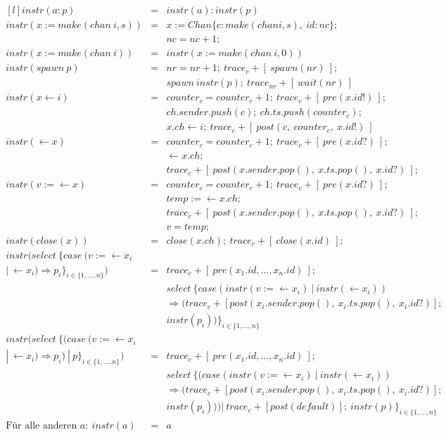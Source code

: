 \begin{align*}
  \begin{matrix*}[l]
    instr(a : p) &=& instr(a) : instr(p)\\
    instr(x := make(chan\ i, s)) & = & x := Chan\{c: make(chan i, s),\ id: nc\};\\
                             &  & nc = nc + 1;\\
    instr(x := make(chan\ i)) & = & instr(x := make(chan\ i, 0))\\
    instr(spawn\ p) & = & nr = nr + 1;\ trace_c + [\ spawn(nr)\ ];\\
                   &   & spawn\ instr(p);\ trace_{nr} + [\ wait(nr)\ ] \\
    instr( x \leftarrow i ) & = & counter_c = counter_c + 1;\ trace_c + [\ pre(x.id!)\ ];\\
      & & ch.sender.push(c);\ ch.ts.push(counter_c);\\
      & & x.ch \leftarrow i;\ trace_c + [\ post(c,\ counter_c,\ x.id!)\ ]\\
    instr( \leftarrow x) & = & counter_c = counter_c + 1;\ trace_c + [\ pre(x.id?)\ ];\\
      & & \leftarrow x.ch;\\
      & & trace_c + [\ post(x.sender.pop(),\ x.ts.pop(),\ x.id?) \ ];\\
    instr( v := \leftarrow x) & = & counter_c = counter_c + 1;\ trace_c + [\ pre(x.id?)\ ];\\
      & & temp := \leftarrow x.ch;\\
      & & trace_c + [\ post(x.sender.pop(),\ x.ts.pop(),\ x.id?) \ ];\\
      & & v = temp;\\
    instr( close(x) ) & = & close(x.ch);\ trace_c + [\ close(x.id)\ ];\\
    instr(select\ \{case\ (v := \leftarrow x_i\\ 
      |\ \leftarrow x_i) \Rightarrow p_i\}_{i \in \{1, \ldots, n\}}) & = & trace_c +
      [\ pre(x_1.id, \ldots, x_n.id)\ ];\\
      & & select\ \{case (instr(v := \leftarrow x_i)\ |\ instr(\leftarrow x_i))\\
      & & \Rightarrow (trace_c + [post(x_i.sender.pop(),\ x_i.ts.pop(),\ x_i.id?)];\\
      & & instr(p_i))\}_{i\in\{1, \ldots, n\}} \\
    instr(select\ \{(case\ (v := \leftarrow x_i\\ 
      |\ \leftarrow x_i) \Rightarrow p_i)\ |\ p\}_{i \in \{1, \ldots, n\}}) & = & trace_c +
      [\ pre(x_1.id, \ldots, x_n.id)\ ];\\
      & & select\ \{(case (instr(v := \leftarrow x_i)\ |\ instr(\leftarrow x_i))\\
      & & \Rightarrow (trace_c + [post(x_i.sender.pop(),\ x_i.ts.pop(),\ x_i.id?)];\\
      & & instr(p_i))) |\ trace_c + [post(default)];\ instr(p)\}_{i\in\{1, \ldots, n\}} \\
    \text{Für alle anderen } a:\ instr(a) &=& a 
  \end{matrix*}
\end{align*}

